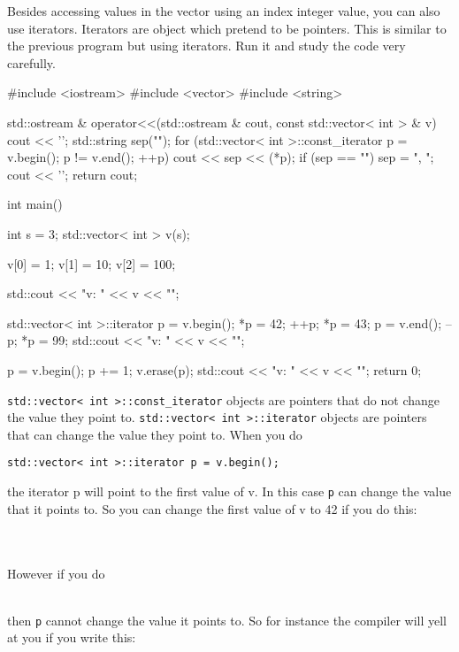 Besides accessing values in the vector using an index integer value, you
can also use iterators. Iterators are object which pretend to be
pointers. This is similar to the previous program but using iterators.
Run it and study the code very carefully.
\begin{console}
#include <iostream>
#include <vector>
#include <string>

std::ostream & operator<<(std::ostream & cout,
             const std::vector< int > & v)
{    
     cout << '{';
     std::string sep("");
     for (std::vector< int >::const_iterator p =
                                             v.begin();
          p != v.end(); ++p)
          { 
              cout << sep << (*p);
              if (sep == "") sep = ", ";
          }
          cout << '}';
          return cout;
}

int main()
{   
    int s = 3;
    std::vector< int > v(s);
    
    v[0] = 1; v[1] = 10; v[2] = 100;

    std::cout << "v: " << v << "\n";

    std::vector< int >::iterator p = v.begin();
    *p = 42;
    ++p;
    *p = 43;
    p = v.end();
    --p;
    *p = 99;
    std::cout << "v: " << v << "\n";

    p = v.begin();
    p += 1;
    v.erase(p);
    std::cout << "v: " << v << "\n";
    return 0;

} 
\end{console}

\texttt{std::vector< int >::const\_iterator} objects
are pointers that do not change the value they point to.
\texttt{std::vector< int >::iterator} objects are
pointers that can change the value they point to. When you do
\begin{center}
\texttt{std::vector< int >::iterator p = v.begin();}
\end{center}
the iterator p will point to the first value of v. In this case \texttt{p}
can change the value that it points to. So you can change the first
value of v to 42 if you do this:

\\
\\

However if you do

\\

then \texttt{p} cannot change the value it points to. So for instance the
compiler will yell at you if you write this:

